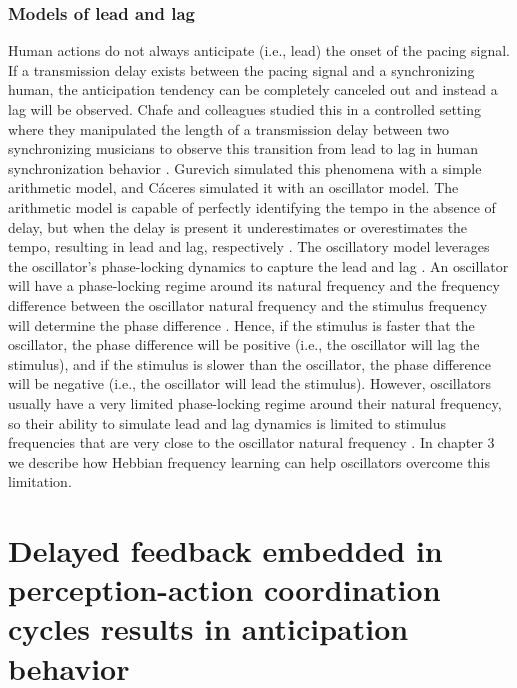 \documentclass{report}
\begin{document}
\subsection{Models of lead and lag} 
Human actions do not always anticipate (i.e., lead) the onset of the pacing signal. If a transmission delay exists between the pacing signal and a synchronizing human, the anticipation tendency can be completely canceled out and instead a lag will be observed. Chafe and colleagues studied this in a controlled setting where they manipulated the length of a transmission delay between two synchronizing musicians to observe this transition from lead to lag in human synchronization behavior \cite{chafe2010effect}. Gurevich \cite{gurevish2004simulation} simulated this phenomena with a simple arithmetic model, and C\'{a}ceres \cite{caceres2013synchronization} simulated it with an oscillator model. The arithmetic model is capable of perfectly identifying the tempo in the absence of delay, but when the delay is present it underestimates or overestimates the tempo, resulting in lead and lag, respectively \cite{gurevish2004simulation}. The oscillatory model leverages the oscillator's phase-locking dynamics to capture the lead and lag \cite{caceres2013synchronization}. An oscillator will have a phase-locking regime around its natural frequency and the frequency difference between the oscillator natural frequency and the stimulus frequency will determine the phase difference \cite{kim2015signal}. Hence, if the stimulus is faster that the oscillator, the phase difference will be positive (i.e., the oscillator will lag the stimulus), and if the stimulus is slower than the oscillator, the phase difference will be negative (i.e., the oscillator will lead the stimulus). However, oscillators usually have a very limited phase-locking regime around their natural frequency, so their ability to simulate lead and lag dynamics is limited to stimulus frequencies that are very close to the oscillator natural frequency \cite{kim2015signal}. In chapter 3 we describe how Hebbian frequency learning can help oscillators overcome this limitation. 


\chapter{Delayed feedback embedded in perception-action coordination cycles results in anticipation behavior}
\end{document}
